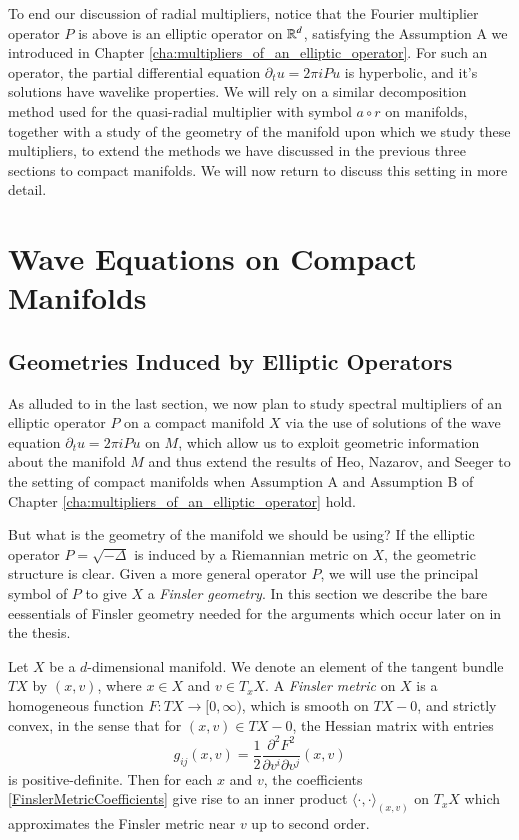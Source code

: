 To end our discussion of radial multipliers, notice that the Fourier multiplier operator $P$ is above is an elliptic operator on $\operatorname{\mathbb{R}}^d$, satisfying the Assumption A we introduced in Chapter \ref{cha:multipliers_of_an_elliptic_operator}. For such an operator, the partial differential equation $\partial_t u = 2 \pi i P u$ is hyperbolic, and it's solutions have wavelike properties. We will rely on a similar decomposition method used for the quasi-radial multiplier with symbol $a \circ r$ on manifolds, together with a study of the geometry of the manifold upon which we study these multipliers, to extend the methods we have discussed in the previous three sections to compact manifolds. We will now return to discuss this setting in more detail.








\chapter{Wave Equations on Compact Manifolds}

\section{Geometries Induced by Elliptic Operators}

As alluded to in the last section, we now plan to study spectral multipliers of an elliptic operator $P$ on a compact manifold $X$ via the use of solutions of the wave equation $\partial_t u = 2 \pi i P u$ on $M$, which allow us to exploit geometric information about the manifold $M$ and thus extend the results of Heo, Nazarov, and Seeger to the setting of compact manifolds when Assumption A and Assumption B of Chapter \ref{cha:multipliers_of_an_elliptic_operator} hold.

But what is the geometry of the manifold we should be using? If the elliptic operator $P = \sqrt{-\Delta}$ is induced by a Riemannian metric on $X$, the geometric structure is clear. Given a more general operator $P$, we will use the principal symbol of $P$ to give $X$ a \emph{Finsler geometry}. In this section we describe the bare eessentials of Finsler geometry needed for the arguments which occur later on in the thesis.

Let $X$ be a $d$-dimensional manifold. We denote an element of the tangent bundle $TX$ by $(x,v)$, where $x \in X$ and $v \in T_x X$. A \emph{Finsler metric} on $X$ is a homogeneous function $F: T X \to [0,\infty)$, which is smooth on $TX - 0$, and strictly convex, in the sense that for $(x,v) \in TX - 0$, the Hessian matrix with entries
%
\begin{equation} \label{FinslerMetricCoefficients}
    g_{ij}(x,v) = \frac{1}{2} \frac{\partial^2 F^2}{\partial v^i \partial v^j}(x,v)
\end{equation}
%
is positive-definite. Then for each $x$ and $v$, the coefficients \eqref{FinslerMetricCoefficients} give rise to an inner product $\langle \cdot, \cdot \rangle_{(x,v)}$ on $T_x X$ which approximates the Finsler metric near $v$ up to second order.

